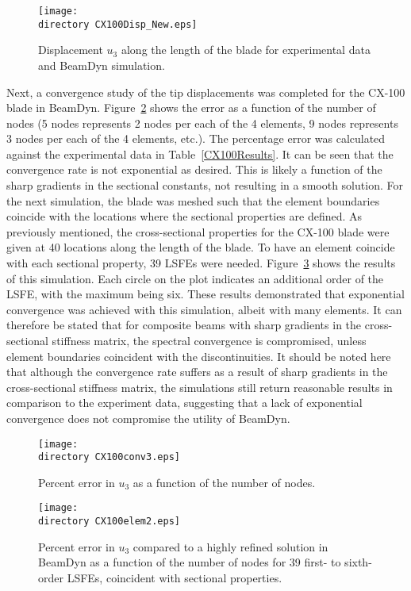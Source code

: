\documentclass{aiaa-tc}
\def\directory{EPSF/}
\begin{document}
\begin{figure}
\centering
\texttt{[image: \\directory CX100Disp\_New.eps]}
\caption{Displacement $u_3$ along the length of the blade for experimental data and BeamDyn simulation.} 
\label{CX100Disp_New}
\end{figure}

Next, a convergence study of the tip displacements was completed for the CX-100 blade in BeamDyn. Figure~\ref{CX100conv3} shows the error as a function of the number of nodes (5 nodes represents 2 nodes per each of the 4 elements, 9 nodes represents 3 nodes per each of the 4 elements, etc.). The percentage error was calculated against the experimental data in Table~\ref{CX100Results}. It can be seen that the convergence rate is not exponential as desired. This is likely a function of the sharp gradients in the sectional constants, not resulting in a smooth solution. For the next simulation, the blade was meshed such that the element boundaries coincide with the locations where the sectional properties are defined. As previously mentioned, the cross-sectional properties for the CX-100 blade were given at 40 locations along the length of the blade. To have an element coincide with each sectional property, 39 LSFEs were needed. Figure~\ref{CX100elem2} shows the results of this simulation. Each circle on the plot indicates an additional order of the LSFE, with the maximum being six. These results demonstrated that  exponential convergence was achieved with this simulation, albeit with many elements. It can therefore be stated that for composite beams with sharp gradients in the cross-sectional stiffness matrix, the spectral convergence is compromised, unless element boundaries coincident with the discontinuities. It should be noted here that although the convergence rate suffers as a result of sharp gradients in the cross-sectional stiffness matrix, the simulations still return reasonable results in comparison to the experiment data, suggesting that a lack of exponential convergence does not compromise the utility of BeamDyn.
  

\begin{figure}
\centering
\texttt{[image: \\directory CX100conv3.eps]}
\caption{ Percent error in $u_3$ as a function of the number of nodes.} 
\label{CX100conv3}
\end{figure}

\begin{figure}
\centering
\texttt{[image: \\directory CX100elem2.eps]}
\caption{Percent error in $u_3$ compared to a highly refined solution in BeamDyn as a function of the number of nodes for 39 first- to sixth-order LSFEs, coincident with sectional properties.} 
\label{CX100elem2}
\end{figure}
\end{document}
